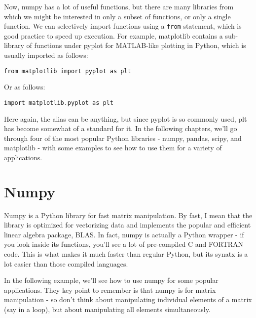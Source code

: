 \documentclass[12pt]{article}
\newcommand{\code}{\texttt}
\begin{document}
Now, numpy has a lot of useful functions, but there are many libraries from which we might be interested in only a subset of functions, or only a single function. We can selectively import functions using a \code{from} statement, which is good practice to speed up execution. For example, matplotlib contains a sub-library of functions under pyplot for MATLAB-like plotting in Python, which is usually imported as follows:

\begin{lstlisting}[frame=single] 
from matplotlib import pyplot as plt
\end{lstlisting}

Or as follows:

\begin{lstlisting}[frame=single] 
import matplotlib.pyplot as plt
\end{lstlisting}

Here again, the alias can be anything, but since pyplot is so commonly used, plt has become somewhat of a standard for it. In the following chapters, we'll go through four of the most popular Python libraries - numpy, pandas, scipy, and matplotlib - with some examples to see how to use them for a variety of applications.

\newpage
\section{Numpy}
Numpy is a Python library for fast matrix manipulation. By fast, I mean that the library is optimized for vectorizing data and implements the popular and efficient linear algebra package, BLAS. In fact, numpy is actually a Python wrapper - if you look inside its functions, you'll see a lot of pre-compiled C and FORTRAN code. This is what makes it much faster than regular Python, but its synatx is a lot easier than those compiled languages.

In the following example, we'll see how to use numpy for some popular applications. They key point to remember is that numpy is for matrix manipulation - so don't think about manipulating individual elements of a matrix (say in a loop), but about manipulating all elements simultaneously. 
\end{document}
